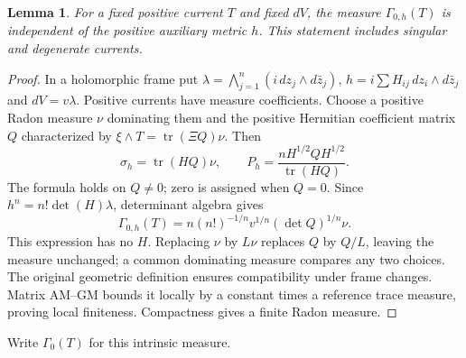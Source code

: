 \documentclass[11pt]{article}
\newcommand{\tr}{\operatorname{tr}}
\newtheorem{lemma}[theorem]{Lemma}
\theoremstyle{remark}\newtheorem{remark}[theorem]{Remark}
\begin{document}
\begin{lemma}\label{lem:intrinsic}
For a fixed positive current $T$ and fixed $dV$, the measure
$\Gamma_{0,h}(T)$ is independent of the positive auxiliary metric $h$.
This statement includes singular and degenerate currents.
\end{lemma}
\begin{proof}
In a holomorphic frame put
$\lambda=\bigwedge_{j=1}^n(i\,dz_j\wedge d\bar z_j)$,
$h=i\sum H_{ij}\,dz_i\wedge d\bar z_j$ and $dV=v\lambda$.
Positive currents have measure coefficients. Choose a positive
Radon measure $\nu$ dominating them and the positive Hermitian
coefficient matrix $Q$ characterized by
$\xi\wedge T=\tr(\Xi Q)\nu$. Then
\[
 \sigma_h=\tr(HQ)\nu,\qquad
 P_h=\frac{nH^{1/2}QH^{1/2}}{\tr(HQ)}.
\]
The formula holds on $Q\ne0$; zero is assigned when $Q=0$.
Since $h^n=n!\det(H)\lambda$, determinant algebra gives
\begin{equation}\label{eq:intrinsic}
 \Gamma_{0,h}(T)
 =n(n!)^{-1/n}v^{1/n}(\det Q)^{1/n}\nu.
\end{equation}
This expression has no $H$. Replacing $\nu$ by $L\nu$ replaces
$Q$ by $Q/L$, leaving the measure unchanged; a common dominating
measure compares any two choices. The original geometric definition
ensures compatibility under frame changes. Matrix AM--GM bounds it
locally by a constant times a reference trace measure, proving local
finiteness. Compactness gives a finite Radon measure.
\end{proof}
Write $\Gamma_0(T)$ for this intrinsic measure.
\end{document}
